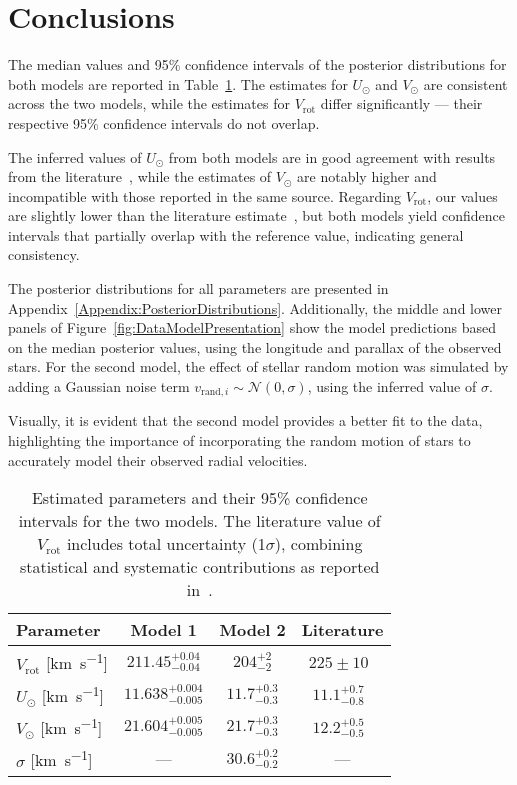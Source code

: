 \section{Conclusions}

The median values and 95\% confidence intervals of the posterior distributions for both models are reported in Table~\ref{tab:parameter_estimates}. The estimates for $U_\odot$ and $V_\odot$ are consistent across the two models, while the estimates for $V_{\text{rot}}$ differ significantly — their respective 95\% confidence intervals do not overlap.

The inferred values of $U_\odot$ from both models are in good agreement with results from the literature~\cite{LocalKinematics}, while the estimates of $V_\odot$ are notably higher and incompatible with those reported in the same source. Regarding $V_{\text{rot}}$, our values are slightly lower than the literature estimate~\cite{GalacticKinematics}, but both models yield confidence intervals that partially overlap with the reference value, indicating general consistency.

The posterior distributions for all parameters are presented in Appendix~\ref{Appendix:PosteriorDistributions}. Additionally, the middle and lower panels of Figure~\ref{fig:DataModelPresentation} show the model predictions based on the median posterior values, using the longitude and parallax of the observed stars. For the second model, the effect of stellar random motion was simulated by adding a Gaussian noise term $v_{\text{rand}, i} \sim \mathcal{N}(0, \sigma)$, using the inferred value of $\sigma$.

Visually, it is evident that the second model provides a better fit to the data, highlighting the importance of incorporating the random motion of stars to accurately model their observed radial velocities.

\begin{table}[H]
    \centering
    \begin{tabular}{l c c | c}
        \hline
        Parameter & Model 1 & Model 2 & Literature \\
        \hline
        $V_{\text{rot}}$ [\unit{\kilo\meter\per\second}] & $211.45^{+0.04}_{-0.04}$ & $204^{+2}_{-2}$ & $225 \pm 10$~\cite{GalacticKinematics} \\
        $U_{\odot}$ [\unit{\kilo\meter\per\second}] & $11.638^{+0.004}_{-0.005}$ & $11.7^{+0.3}_{-0.3}$ & $11.1^{+0.7}_{-0.8}$~\cite{LocalKinematics} \\
        $V_{\odot}$ [\unit{\kilo\meter\per\second}] & $21.604^{+0.005}_{-0.005}$ & $21.7^{+0.3}_{-0.3}$ & $12.2^{+0.5}_{-0.5}$~\cite{LocalKinematics} \\
        $\sigma$ [\unit{\kilo\meter\per\second}] & --- & $30.6^{+0.2}_{-0.2}$ & --- \\
        \hline
    \end{tabular}
    \caption{Estimated parameters and their 95\% confidence intervals for the two models. The literature value of $V_{\text{rot}}$ includes total uncertainty (1$\sigma$), combining statistical and systematic contributions as reported in~\cite{GalacticKinematics}.}
    \label{tab:parameter_estimates}
\end{table}
